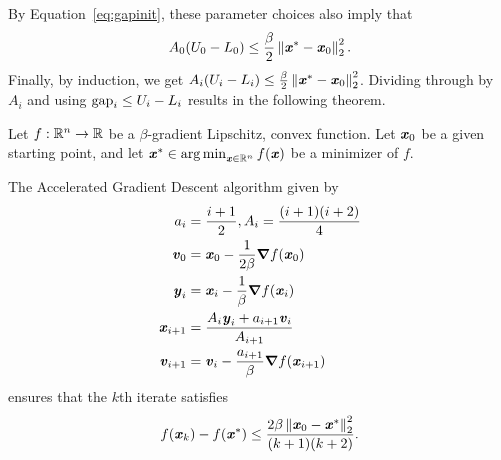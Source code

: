 By Equation~\eqref{eq:gapinit}, these parameter choices also imply
that
\[
  A_0 (U_0 - L_0) \leq \frac{\beta }{2}\norm{ \xx^* - \xx_0}_2^2  .
\]
Finally, by induction, we get
$ A_{i}( U_{i} - L_{i})  \leq  \frac{\beta }{2}\norm{ \xx^* -
  \xx_0}_2^2$.
Dividing through by $A_i$ and using $\gap_i \leq  U_{i} - L_{i}$
results in the following theorem.
\begin{theorem}
  Let $f : \R^n \to \R$ be a $\beta$-gradient Lipschitz, convex
  function.
  Let $\xx_0$ be a given starting point,
  and let $\xx^* \in \argmin_{\xx \in \R^n} f(\xx)$ be a minimizer of
  $f$.

The Accelerated Gradient Descent algorithm given by
\begin{align*}
  a_i &= \frac{i+1}{2}, A_i = \frac{(i+1)(i+2)}{4}     \\
 \vv_0 & = \xx_0 - \frac{1}{2\beta} \grad f(\xx_0) \\
  \yy_{i} &= \xx_{i} - \frac{1}{\beta} \grad f(\xx_{i}) \\
  \xx_{i+1} &=  \frac{
A_{i} \yy_{i} + a_{i+1} \vv_{i}
            }{A_{i+1}} \\
  \vv_{i+1} &= \vv_{i}  - \frac{a_{i+1}}{\beta} \grad f(\xx_{i+1})
\end{align*}
 ensures that the $k$th iterate satisfies
 \[
   f(\xx_{k}) - f(\xx^*)\leq \frac{2 \beta \norm{\xx_0 - \xx^*}_2^2}{(k+1)(k+2)}
   .
 \]
\end{theorem}





